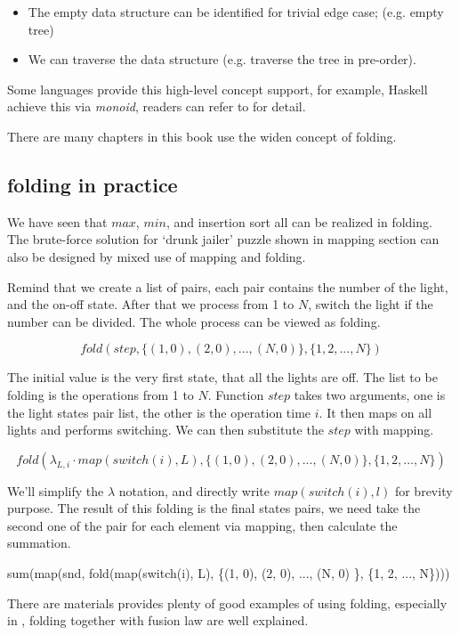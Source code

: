 \documentclass{article}
\begin{document}
\begin{itemize}
\item The empty data structure can be identified for trivial edge case; (e.g. empty tree)
\item We can traverse the data structure (e.g. traverse the tree in pre-order).
\end{itemize}

Some languages provide this high-level concept support, for example, Haskell achieve this via
{\em monoid}, readers can refer to \cite{learn-haskell} for detail.

There are many chapters in this book use the widen concept of folding.

\subsection{folding in practice}

We have seen that $max$, $min$, and insertion sort all can be realized in folding. The 
brute-force solution for `drunk jailer' puzzle shown in mapping section can also be
designed by mixed use of mapping and folding.

Remind that we create a list of pairs, each pair contains the number of the light, and 
the on-off state. After that we process from 1 to $N$, switch the light if the number
can be divided. The whole process can be viewed as folding.

\[
fold(step, \{(1, 0), (2, 0), ..., (N, 0) \}, \{1, 2, ..., N\})
\]

The initial value is the very first state, that all the lights are off. The list to be
folding is the operations from 1 to $N$. Function $step$ takes two arguments, one is
the light states pair list, the other is the operation time $i$. It then maps
on all lights and performs switching. We can then substitute the $step$ with mapping.

\[
fold(\lambda_{L, i} \cdot map(switch(i), L), \{(1, 0), (2, 0), ..., (N, 0) \}, \{1, 2, ..., N\})
\]

We'll simplify the $\lambda$ notation, and directly write $map(switch(i), l)$ for brevity purpose.
The result of this folding is the final states pairs, we need take the second one of the pair
for each element via mapping, then calculate the summation.

\be
sum(map(snd, fold(map(switch(i), L), \{(1, 0), (2, 0), ..., (N, 0) \}, \{1, 2, ..., N\})))
\ee

There are materials provides plenty of good examples of using folding, especially in \cite{fp-pearls},
folding together with fusion law are well explained.
\end{document}
